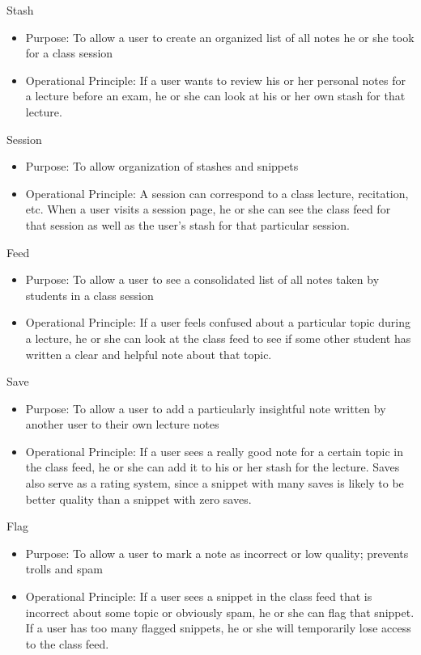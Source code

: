 \documentclass{article}
\begin{document}
Stash
\begin{itemize}
\item Purpose: To allow a user to create an organized list of all notes he or she took for a class session
\item Operational Principle: If a user wants to review his or her personal notes for a lecture before an exam, he or she can look at his or her own stash for that lecture.
\end{itemize}

Session
\begin{itemize}
\item Purpose: To allow organization of stashes and snippets
\item Operational Principle: A session can correspond to a class lecture, recitation, etc. When a user visits a session page, he or she can see the class feed for that session as well as the user's stash for that particular session.
\end{itemize}

Feed
\begin{itemize}
\item Purpose: To allow a user to see a consolidated list of all notes taken by students in a class session
\item Operational Principle: If a user feels confused about a particular topic during a lecture, he or she can look at the class feed to see if some other student has written a clear and helpful note about that topic.
\end{itemize}

Save
\begin{itemize}
\item Purpose: To allow a user to add a particularly insightful note written by another user to their own lecture notes
\item Operational Principle: If a user sees a really good note for a certain topic in the class feed, he or she can add it to his or her stash for the lecture. Saves also serve as a rating system, since a snippet with many saves is likely to be better quality than a snippet with zero saves.
\end{itemize}

Flag
\begin{itemize}
\item Purpose: To allow a user to mark a note as incorrect or low quality; prevents trolls and spam
\item Operational Principle: If a user sees a snippet in the class feed that is incorrect about some topic or obviously spam, he or she can flag that snippet. If a user has too many flagged snippets, he or she will temporarily lose access to the class feed.
\end{itemize}
\end{document}
